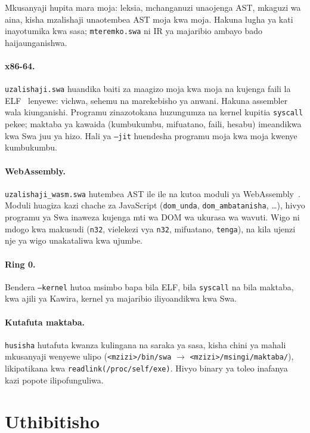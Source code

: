 \documentclass[11pt,a4paper]{article}
\begin{document}
Mkusanyaji hupita mara moja: leksia, mchanganuzi unaojenga AST, mkaguzi wa aina, kisha mzalishaji unaotembea AST moja kwa moja. Hakuna lugha ya kati inayotumika kwa sasa; \texttt{mteremko.swa} ni IR ya majaribio ambayo bado haijaunganishwa.

\paragraph{x86-64.} \texttt{uzalishaji.swa} huandika baiti za maagizo moja kwa moja na kujenga faili la ELF~\cite{elf} lenyewe: vichwa, sehemu na marekebisho ya anwani. Hakuna assembler wala kiunganishi. Programu zinazotokana huzungumza na kernel kupitia \texttt{syscall} pekee; maktaba ya kawaida (kumbukumbu, mifuatano, faili, hesabu) imeandikwa kwa Swa juu ya hizo. Hali ya \texttt{--jit} huendesha programu moja kwa moja kwenye kumbukumbu.

\paragraph{WebAssembly.} \texttt{uzalishaji\_wasm.swa} hutembea AST ile ile na kutoa moduli ya WebAssembly~\cite{haas2017}. Moduli huagiza kazi chache za JavaScript (\texttt{dom\_unda}, \texttt{dom\_ambatanisha}, \ldots), hivyo programu ya Swa inaweza kujenga mti wa DOM wa ukurasa wa wavuti. Wigo ni mdogo kwa makusudi (\texttt{n32}, vielekezi vya \texttt{n32}, mifuatano, \texttt{tenga}), na kila ujenzi nje ya wigo unakataliwa kwa ujumbe.

\paragraph{Ring 0.} Bendera \texttt{--kernel} hutoa msimbo bapa bila ELF, bila \texttt{syscall} na bila maktaba, kwa ajili ya Kawira, kernel ya majaribio iliyoandikwa kwa Swa.

\paragraph{Kutafuta maktaba.} \texttt{husisha} hutafuta kwanza kulingana na saraka ya sasa, kisha chini ya mahali mkusanyaji wenyewe ulipo (\texttt{<mzizi>/bin/swa} $\to$ \texttt{<mzizi>/msingi/maktaba/}), likipatikana kwa \texttt{readlink(/proc/self/exe)}. Hivyo binary ya toleo inafanya kazi popote ilipofunguliwa.

\section{Uthibitisho}\label{sec:uthibitisho}
\end{document}

